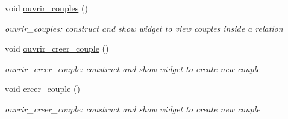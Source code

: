 \begin{DoxyCompactItemize}
void \hyperlink{class_interface_addd6497067b6e680dee59e00726ea22e}{ouvrir\+\_\+couples} ()
\begin{DoxyCompactList}\small\item\em ouvrir\+\_\+couples\+: construct and show widget to view couples inside a relation \end{DoxyCompactList}\item 
\mbox{\label{class_interface_a7f3dca1c4257a0af289a56dafe1c3025}} 
void \hyperlink{class_interface_a7f3dca1c4257a0af289a56dafe1c3025}{ouvrir\+\_\+creer\+\_\+couple} ()
\begin{DoxyCompactList}\small\item\em ouvrir\+\_\+creer\+\_\+couple\+: construct and show widget to create new couple \end{DoxyCompactList}\item 
\mbox{\label{class_interface_a10c473d45e7063f2e556f3267b1df85f}} 
void \hyperlink{class_interface_a10c473d45e7063f2e556f3267b1df85f}{creer\+\_\+couple} ()
\begin{DoxyCompactList}\small\item\em ouvrir\+\_\+creer\+\_\+couple\+: construct and show widget to create new couple \end{DoxyCompactList}\end{DoxyCompactItemize}

